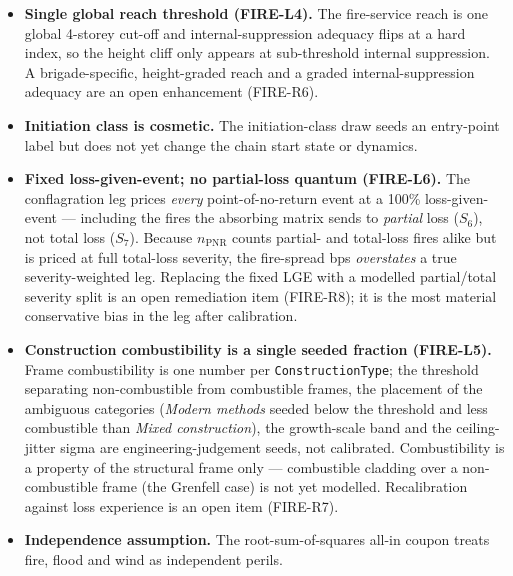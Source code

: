 \documentclass[11pt,a4paper]{article}
\begin{document}
\begin{itemize}
\begin{itemize}
                residual.
        \end{itemize}
        Retuning the intensity-race timescale (e.g.\ a lower $I_{\text{crit}}$
        of order 2--4 so the race competes with the three-step march) so that
        suppression, detection and the residual all become live is an open
        remediation item (FIRE-R5).
  \item \textbf{Single global reach threshold (FIRE-L4).} The fire-service reach
        is one global 4-storey cut-off and internal-suppression adequacy flips at
        a hard index, so the height cliff only appears at sub-threshold internal
        suppression. A brigade-specific, height-graded reach and a graded
        internal-suppression adequacy are an open enhancement (FIRE-R6).
  \item \textbf{Initiation class is cosmetic.} The initiation-class draw seeds an
        entry-point label but does not yet change the chain start state or
        dynamics.
  \item \textbf{Fixed loss-given-event; no partial-loss quantum (FIRE-L6).} The
        conflagration leg prices \emph{every} point-of-no-return event at a
        100\% loss-given-event --- including the fires the absorbing matrix sends
        to \emph{partial} loss ($S_6$), not total loss ($S_7$). Because
        $n_{\text{PNR}}$ counts partial- and total-loss fires alike but is priced
        at full total-loss severity, the fire-spread bps \emph{overstates} a
        true severity-weighted leg. Replacing the fixed LGE with a modelled
        partial/total severity split is an open remediation item (FIRE-R8); it is
        the most material conservative bias in the leg after calibration.
  \item \textbf{Construction combustibility is a single seeded fraction
        (FIRE-L5).} Frame combustibility is one number per
        \texttt{ConstructionType}; the threshold separating non-combustible from
        combustible frames, the placement of the ambiguous categories
        (\emph{Modern methods} seeded below the threshold and less combustible
        than \emph{Mixed construction}), the growth-scale band and the
        ceiling-jitter sigma are engineering-judgement seeds, not calibrated.
        Combustibility is a property of the structural frame only --- combustible
        cladding over a non-combustible frame (the Grenfell case) is not yet
        modelled. Recalibration against loss experience is an open item
        (FIRE-R7).
  \item \textbf{Independence assumption.} The root-sum-of-squares all-in coupon
        treats fire, flood and wind as independent perils.
\end{itemize}
\end{document}
